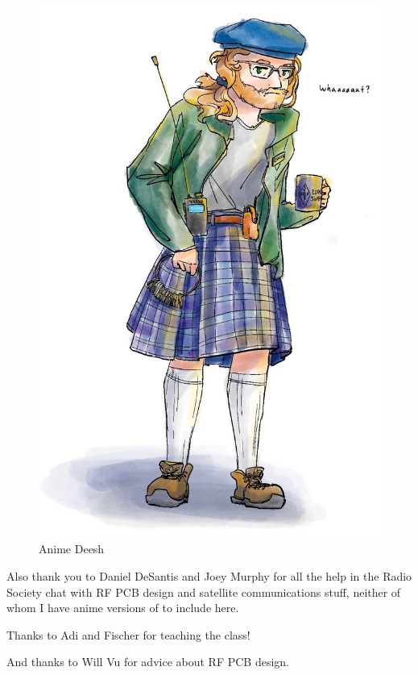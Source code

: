 \documentclass[fleqn]{article}
\begin{document}
\begin{figure}[h]
    \includegraphics[width=5in]{anime_deesh.jpg}
    \caption{Anime Deesh}
\end{figure}

Also thank you to Daniel DeSantis and Joey Murphy for all the help in the Radio Society chat with RF PCB design and satellite communications stuff, neither of whom I have anime versions of to include here.

Thanks to Adi and Fischer for teaching the class!

And thanks to Will Vu for advice about RF PCB design.
\end{document}
